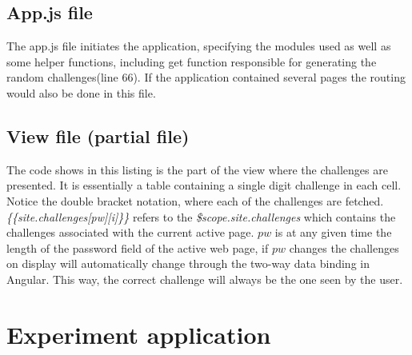 \section{App.js file}\label{app:app.js}


The app.js file initiates the application, specifying the modules used as well as some helper functions, including get function responsible for generating the random challenges(line 66). If the application contained several pages the routing would also be done in this file. 

\section{View file (partial file)}\label{app:view}

The code shows in this listing is the part of the view where the challenges are presented. It is essentially a table containing a single digit challenge in each cell. Notice the double bracket notation, where each of the challenges are fetched. \emph{\{\{site.challenges[pw][i]\}\}} refers to the \emph{\$scope.site.challenges} which contains the challenges associated with the current active page. $pw$ is at any given time the length of the password field of the active web page, if $pw$ changes the challenges on display will automatically change through the two-way data binding in Angular. This way, the correct challenge will always be the one seen by the user.


\chapter{Experiment application}\label{experiment-views}
